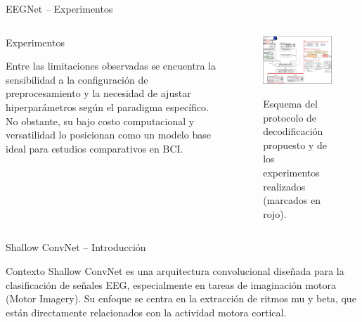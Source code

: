 \documentclass{beamer}
\begin{document}
\begin{frame}{EEGNet – Experimentos}
\begin{columns}[T] %
    \begin{column}{0.50\textwidth}
\begin{block}{Experimentos}

Entre las limitaciones observadas se encuentra la sensibilidad a la configuración de preprocesamiento y la necesidad de ajustar hiperparámetros según el paradigma específico. No obstante, su bajo costo computacional y versatilidad lo posicionan como un modelo base ideal para estudios comparativos en BCI.
        \end{block}
    \end{column}

    \begin{column}{0.5\textwidth}
        \begin{figure}
            \centering
            \href{https://www.sciencedirect.com/science/article/pii/S0893608024007718}{%
            \includegraphics[width=\linewidth]{EEGdecoding.png}%
            }
            \caption{\small Esquema del protocolo de decodificación propuesto y de los experimentos realizados (marcados en rojo).}
            \label{fig:flujo_eeg}
        \end{figure}
    \end{column}
\end{columns}
\end{frame}

\begin{frame}{Shallow ConvNet – Introducción}
\begin{block}{Contexto}
Shallow ConvNet es una arquitectura convolucional diseñada para la clasificación de señales EEG, especialmente en tareas de imaginación motora (Motor Imagery). Su enfoque se centra en la extracción de ritmos mu y beta, que están directamente relacionados con la actividad motora cortical.
\end{block}
\end{frame}
\end{document}
